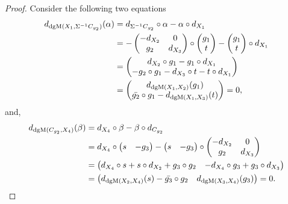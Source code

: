 \begin{proof}
    Consider the following two equations
    \begin{align*}
        d_{\operatorname{dgM}(X_1, \Sigma^{-1} C_{g_2})}(\alpha)
        &= d_{\Sigma^{-1} C_{g_2}} \circ \alpha - \alpha \circ d_{X_1} \\
        &= -
        \begin{pmatrix}
            - d_{X_2} & 0 \\
            g_2 & d_{X_3}
        \end{pmatrix}
        \circ
        \begin{pmatrix}
            g_1 \\
            t
        \end{pmatrix}
        -
        \begin{pmatrix}
            g_1 \\
            t
        \end{pmatrix}
        \circ
        d_{X_1} \\
        &=
        \begin{pmatrix}
            d_{X_2} \circ g_1 - g_1 \circ d_{X_1} \\
            - g_2 \circ g_1 - d_{X_3} \circ t - t \circ d_{X_1}
        \end{pmatrix} \\
        &=
        \begin{pmatrix}
            d_{\operatorname{dgM}(X_1, X_2)}(g_1) \\
            \bar{g_2} \circ g_1 - d_{\operatorname{dgM}(X_1, X_3)}(t)
        \end{pmatrix}
        =
        0,
    \end{align*}
    and,
    \begin{align*}
        d_{\operatorname{dgM}(C_{g_2}, X_4)}(\beta)
        &= d_{X_4} \circ \beta - \beta \circ d_{C_{g_2}} \\
        &= d_{X_4} \circ
        \begin{pmatrix}
            s & -g_3
        \end{pmatrix}
        -
        \begin{pmatrix}
            s & -g_3
        \end{pmatrix}
        \circ
        \begin{pmatrix}
            - d_{X_2} & 0 \\
            g_2 & d_{X_3}
        \end{pmatrix} \\
        &=
        \begin{pmatrix}
            d_{X_4} \circ s + s \circ d_{X_2} + g_3 \circ g_2 & - d_{X_4} \circ g_3 + g_3 \circ d_{X_3}
        \end{pmatrix} \\
        &=
        \begin{pmatrix}
            d_{\operatorname{dgM}(X_2, X_4)}(s) - \bar{g_3} \circ g_2 & d_{\operatorname{dgM}(X_3, X_4)}(g_3)
        \end{pmatrix}
        = 0.
    \end{align*}
    

\end{proof}
